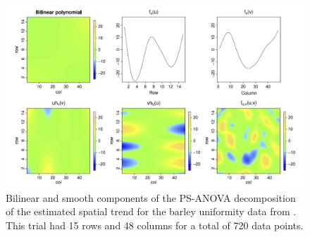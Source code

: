 \begin{figure}[hbtp]
\centering
\includegraphics[width=\textwidth]{../figures/bilinear_polynomial.PNG}
\caption[Bilinear and smooth components of the PS-ANOVA decomposition]{Bilinear and smooth components of the PS-ANOVA decomposition of the estimated spatial trend for the barley uniformity
data from \textcite{rodriguez-alvarez_correcting_2018}. This trial had 15 rows and 48 columns for a total of 720 data points.}
\label{fig:bilinear_and_smooth_decomposition}
\end{figure}



